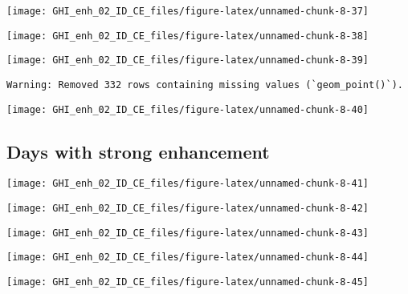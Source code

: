 \documentclass[
  10pt,
  a4paper,oneside]{article}
\begin{document}
\begin{center}\texttt{[image: GHI\_enh\_02\_ID\_CE\_files/figure-latex/unnamed-chunk-8-37]} \end{center}

\begin{center}\texttt{[image: GHI\_enh\_02\_ID\_CE\_files/figure-latex/unnamed-chunk-8-38]} \end{center}

\begin{center}\texttt{[image: GHI\_enh\_02\_ID\_CE\_files/figure-latex/unnamed-chunk-8-39]} \end{center}

\begin{verbatim}
Warning: Removed 332 rows containing missing values (`geom_point()`).
\end{verbatim}

\begin{center}\texttt{[image: GHI\_enh\_02\_ID\_CE\_files/figure-latex/unnamed-chunk-8-40]} \end{center}

\FloatBarrier

\hypertarget{days-with-strong-enhancement}{%
\subsection{Days with strong enhancement}\label{days-with-strong-enhancement}}

\begin{center}\texttt{[image: GHI\_enh\_02\_ID\_CE\_files/figure-latex/unnamed-chunk-8-41]} \end{center}

\begin{center}\texttt{[image: GHI\_enh\_02\_ID\_CE\_files/figure-latex/unnamed-chunk-8-42]} \end{center}

\begin{center}\texttt{[image: GHI\_enh\_02\_ID\_CE\_files/figure-latex/unnamed-chunk-8-43]} \end{center}

\begin{center}\texttt{[image: GHI\_enh\_02\_ID\_CE\_files/figure-latex/unnamed-chunk-8-44]} \end{center}

\begin{center}\texttt{[image: GHI\_enh\_02\_ID\_CE\_files/figure-latex/unnamed-chunk-8-45]} \end{center}
\end{document}
